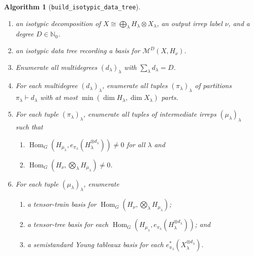 \documentclass[11pt]{article}
\newcommand{\dsN}{\mathbb{N}}
\newcommand{\scM}{\mathcal{M}}
\newcommand{\HomG}[2]{\operatorname{Hom}_G\!\left(#1,#2\right)}
\newtheorem{algorithm}[theorem]{Algorithm}
\theoremstyle{definition}
\begin{document}
\begin{algorithm}[\texttt{build\_isotypic\_data\_tree}]\label{alg:build-isotypic-data-tree}

  \phantom{}

  \begin{enumerate}[label=\textbf{Step \arabic*.},ref=\arabic*,leftmargin=2.8cm]

    \item[\textbf{Input:}] an isotypic decomposition of $X\cong \bigoplus_\lambda H_\lambda\otimes X_\lambda$, an output irrep label $\nu$, and a degree $D \in \dsN_0$.

    \item[\textbf{Output:}] an isotypic data tree recording a basis for $\scM^D(X,H_\nu)$.

    \item \label{alg:build-isotypic-data-tree:step-multidegrees} Enumerate all multidegrees $(d_\lambda)_\lambda$ with $\sum_\lambda d_\lambda=D$.

    \item \label{alg:build-isotypic-data-tree:step-partitions} For each multidegree $(d_\lambda)_\lambda$, enumerate all tuples $(\pi_\lambda)_\lambda$ of partitions $\pi_\lambda\vdash d_\lambda$ with at most $\min(\dim H_\lambda,\dim X_\lambda)$ parts.

    \item \label{alg:build-isotypic-data-tree:step-intermediate-irreps} For each tuple $(\pi_\lambda)_\lambda$, enumerate all tuples of intermediate irreps $(\mu_\lambda)_\lambda$ such that
    \begin{enumerate}[label=\textup{(\alph*)},ref=\theenumi(\alph*),leftmargin=2.2em]
      \item \label{alg:build-isotypic-data-tree:step-schur-constituents} $\HomG{H_{\mu_\lambda}}{e_{\pi_\lambda}(H_\lambda^{\otimes d_\lambda})} \neq 0$ for all $\lambda$ and
      \item \label{alg:build-isotypic-data-tree:step-tensor-product-constituents} $\HomG{H_\nu}{\bigotimes_\lambda H_{\mu_\lambda}}\neq 0$.
    \end{enumerate}

    \item \label{alg:build-isotypic-data-tree:step-bases} For each tuple $(\mu_\lambda)_\lambda$, enumerate
    \begin{enumerate}[label=\textup{(\alph*)},ref=\theenumi(\alph*),leftmargin=2.2em]
      \item \label{alg:build-isotypic-data-tree:step-tensor-train-basis} a tensor-train basis for $\HomG{H_\nu}{\bigotimes_{\lambda} H_{\mu_\lambda}}$;
      \item \label{alg:build-isotypic-data-tree:step-schur-tensor-tree-basis} a tensor-tree basis for each $\HomG{H_{\mu_\lambda}}{e_{\pi_\lambda}(H_\lambda^{\otimes d_\lambda})}$; and
      \item \label{alg:build-isotypic-data-tree:step-ssyt-basis} a semistandard Young tableaux basis for each $e_{\pi_\lambda}^*(X_\lambda^{\otimes d_\lambda})$.
    \end{enumerate}
  \end{enumerate}
\end{algorithm}
\end{document}
